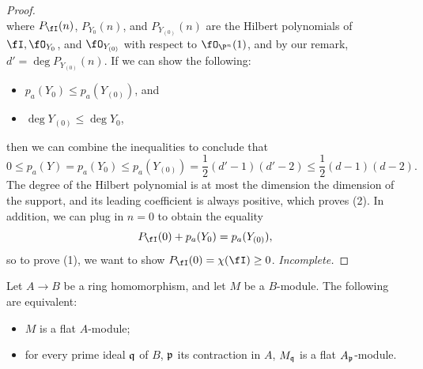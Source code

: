 \documentclass[a4paper]{article}
\begin{document}
\begin{enumerate} [label=\textbf{\arabic*.}, leftmargin=0em]
\begin{proof}
\begin{equation*}
          \end{equation*}
          where $P_{\fI}(n)$, $P_{Y_0}(n)$, and $P_{Y_{(0)}}(n)$ are the Hilbert polynomials of $\fI, \fO_{Y_0}$, and $\fO_{Y_{(0)}}$ with respect to $\fO_{\P^n}(1)$, and by our remark, $d' = \deg P_{Y_{(0)}}(n)$.
          If we can show the following:
          \begin{itemize}
            \item[(1)] $p_a(Y_0) \leq p_a(Y_{(0)})$, and
            \item[(2)] $\deg {Y_{(0)}} \leq \deg{Y_0}$,
          \end{itemize}
          then we can combine the inequalities to conclude that
          \begin{equation*}
            0 \leq p_a(Y) = p_a(Y_0) \leq p_a(Y_{(0)}) = \frac{1}{2}(d' - 1)(d' - 2) \leq \frac{1}{2}(d - 1)(d - 2).
          \end{equation*}
          The degree of the Hilbert polynomial is at most the dimension the dimension of the support, and its leading coefficient is always positive, which proves (2).
          In addition, we can plug in $n = 0$ to obtain the equality
          \begin{equation*}
            P_\fI(0) + p_a(Y_0) = p_a(Y_{(0)}),
          \end{equation*}
          so to prove (1), we want to show $P_\fI(0) = \chi(\fI) \geq 0$.
          \textit{Incomplete.}
        \end{proof}

        \newpage

        \begin{lemma} 
          Let $A \to B$ be a ring homomorphism, and let $M$ be a $B$-module.
          The following are equivalent:
          \begin{itemize}
            \item[(i)] $M$ is a flat $A$-module;
            \item[(ii)] for every prime ideal $\mathfrak{q}$ of $B$, $\mathfrak{p}$ its contraction in $A$, $M_{\mathfrak{q}}$ is a flat $A_{\mathfrak{p}}$-module.
          \end{itemize}
        \end{lemma}


\end{enumerate}
\end{document}
